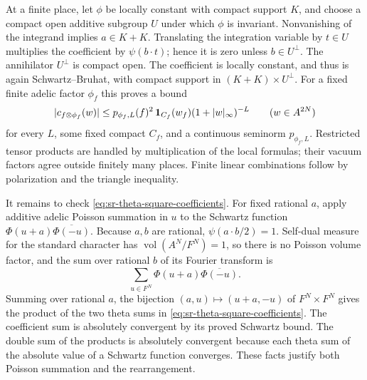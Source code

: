 At a finite place, let \(\phi\) be locally constant with compact
support \(K\), and choose a compact open additive subgroup \(U\)
under which \(\phi\) is invariant.
Nonvanishing of the integrand implies \(a\in K+K\).
Translating the integration variable by \(t\in U\) multiplies
the coefficient by \(\psi(b\cdot t)\); hence it is zero unless
\(b\in U^\perp\).  The annihilator \(U^\perp\) is compact open.
The coefficient is locally constant, and thus is again
Schwartz--Bruhat, with compact support in
\((K+K)\times U^\perp\).
For a fixed finite adelic factor \(\phi_f\) this proves a bound
\[
 |c_{f\otimes\phi_f}(w)|
 \le p_{\phi_f,L}(f)^2\,
       {\bf1}_{C_f}(w_f)(1+|w|_\infty)^{-L}
 \qquad(w\in A^{2N})
\]
for every \(L\), some fixed compact \(C_f\), and a continuous
seminorm \(p_{\phi_f,L}\).
Restricted tensor products are handled by multiplication of the
local formulas; their vacuum factors agree outside finitely many
places.  Finite linear combinations follow by polarization and the
triangle inequality.

It remains to check \eqref{eq:sr-theta-square-coefficients}.
For fixed rational \(a\), apply additive adelic Poisson summation
in \(u\) to the Schwartz function
\(\Phi(u+a)\overline{\Phi(-u)}\).
Because \(a,b\) are rational, \(\psi(a\cdot b/2)=1\).
Self-dual measure for the standard character has
\(\operatorname{vol}(A^N/F^N)=1\), so there is no Poisson volume
factor, and the sum over rational \(b\) of its Fourier transform is
\[
 \sum_{u\in F^N}\Phi(u+a)\overline{\Phi(-u)}.
\]
Summing over rational \(a\), the bijection
\((a,u)\mapsto(u+a,-u)\) of \(F^N\times F^N\) gives the product
of the two theta sums in
\eqref{eq:sr-theta-square-coefficients}.
The coefficient sum is absolutely convergent by its proved Schwartz
bound.  The double sum of the products is absolutely convergent
because each theta sum of the absolute value of a Schwartz function
converges.  These facts justify both Poisson summation and the
rearrangement.

